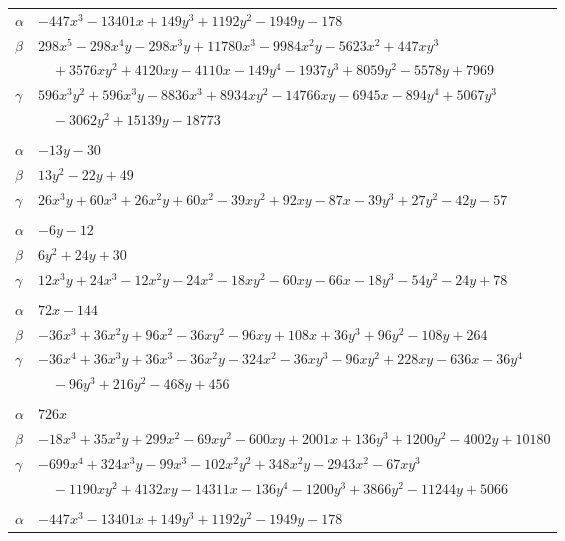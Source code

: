 \documentclass[11pt]{article}
\begin{document}
\begin{longtable}{@{}ll@{}}
$\alpha$ & $-447x^{3}-13401x+149y^{3}+1192y^{2}-1949y-178$\\
$\beta$ & $298x^{5}-298x^{4}y-298x^{3}y+11780x^{3}-9984x^{2}y-5623x^{2}+447xy^{3}$\\
 & $\quad +3576xy^{2}+4120xy-4110x-149y^{4}-1937y^{3}+8059y^{2}-5578y+7969$\\
$\gamma$ & $596x^{3}y^{2}+596x^{3}y-8836x^{3}+8934xy^{2}-14766xy-6945x-894y^{4}+5067y^{3}$\\
 & $\quad -3062y^{2}+15139y-18773$\\
\addlinespace[3pt]
\multicolumn{2}{@{}l}{$\{i,j\}=\{2,8\}$, $k_{ij}=2^{4}$}\\
$\alpha$ & $-13y-30$\\
$\beta$ & $13y^{2}-22y+49$\\
$\gamma$ & $26x^{3}y+60x^{3}+26x^{2}y+60x^{2}-39xy^{2}+92xy-87x-39y^{3}+27y^{2}-42y-57$\\
\addlinespace[3pt]
\multicolumn{2}{@{}l}{$\{i,j\}=\{2,41\}$, $k_{ij}=2^{3}\cdot 3^{2}$}\\
$\alpha$ & $-6y-12$\\
$\beta$ & $6y^{2}+24y+30$\\
$\gamma$ & $12x^{3}y+24x^{3}-12x^{2}y-24x^{2}-18xy^{2}-60xy-66x-18y^{3}-54y^{2}-24y+78$\\
\addlinespace[3pt]
\multicolumn{2}{@{}l}{$\{i,j\}=\{2,45\}$, $k_{ij}=2^{5}\cdot 3^{2}$}\\
$\alpha$ & $72x-144$\\
$\beta$ & $-36x^{3}+36x^{2}y+96x^{2}-36xy^{2}-96xy+108x+36y^{3}+96y^{2}-108y+264$\\
$\gamma$ & $-36x^{4}+36x^{3}y+36x^{3}-36x^{2}y-324x^{2}-36xy^{3}-96xy^{2}+228xy-636x-36y^{4}$\\
 & $\quad -96y^{3}+216y^{2}-468y+456$\\
\addlinespace[3pt]
\multicolumn{2}{@{}l}{$\{i,j\}=\{2,48\}$, $k_{ij}=2\cdot 3^{2}\cdot 7\cdot 11^{2}$}\\
$\alpha$ & $726x$\\
$\beta$ & $-18x^{3}+35x^{2}y+299x^{2}-69xy^{2}-600xy+2001x+136y^{3}+1200y^{2}-4002y+10180$\\
$\gamma$ & $-699x^{4}+324x^{3}y-99x^{3}-102x^{2}y^{2}+348x^{2}y-2943x^{2}-67xy^{3}$\\
 & $\quad -1190xy^{2}+4132xy-14311x-136y^{4}-1200y^{3}+3866y^{2}-11244y+5066$\\
\addlinespace[3pt]
\multicolumn{2}{@{}l}{$\{i,j\}=\{2,56\}$, $k_{ij}=2^{5}\cdot 3^{2}\cdot 7\cdot 13$}\\
$\alpha$ & $-447x^{3}-13401x+149y^{3}+1192y^{2}-1949y-178$\\

\end{longtable}
\end{document}
